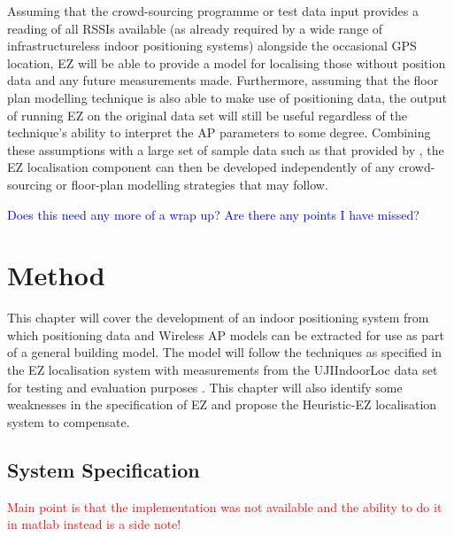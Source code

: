 \documentclass{UoYCSproject}
\begin{document}
        Assuming that the crowd-sourcing programme or test data input provides a reading of all RSSIs available (as already required by a wide range of infrastructureless indoor positioning systems) alongside the occasional GPS location, EZ will be able to provide a model for localising those without position data and any future measurements made. Furthermore, assuming that the floor plan modelling technique is also able to make use of positioning data, the output of running EZ on the original data set will still be useful regardless of the technique's ability to interpret the AP parameters to some degree. Combining these assumptions with a large set of sample data such as that provided by \citet{torres2014ujiindoorloc}, the EZ localisation component can then be developed independently of any crowd-sourcing or floor-plan modelling strategies that may follow.

		\textcolor{blue}{Does this need any more of a wrap up? Are there any points I have missed?}
 
	\chapter{Method}
    \label{chap:method}
	
		This chapter will cover the development of an indoor positioning system from which positioning data and Wireless AP models can be extracted for use as part of a general building model. The  model will follow the techniques as specified in the EZ localisation system \citep{chintalapudi2010indoor} with measurements from the UJIIndoorLoc data set for testing and evaluation purposes \citep{torres2014ujiindoorloc}. This chapter will also identify some weaknesses in the specification of EZ and propose the Heuristic-EZ localisation system to compensate.
		
		\section{System Specification}
        \label{sec:sysspec}
            
            \textcolor{red}{Main point is that the implementation was not available and the ability to do it in matlab instead is a side note!}
            
\end{document}
